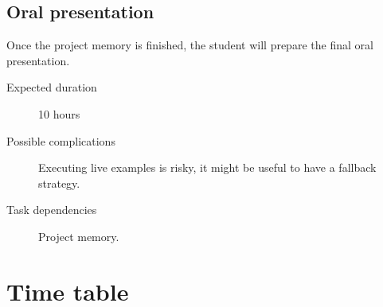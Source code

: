 \documentclass[a4paper,11pt,titlepage,abstract,numbers=noenddot,automark,mnsy,intlimits,rgb,dvipsnames]{report}
\begin{document}
\subsection{Oral presentation}
Once the project memory is finished, the student will prepare the final oral presentation.
\begin{description}
\item[Expected duration]
10 hours
\item[Possible complications]
Executing live examples is risky, it might be useful to have a fallback strategy.
\item[Task dependencies]
Project memory.
\end{description}
\section{Time table}
\end{document}
